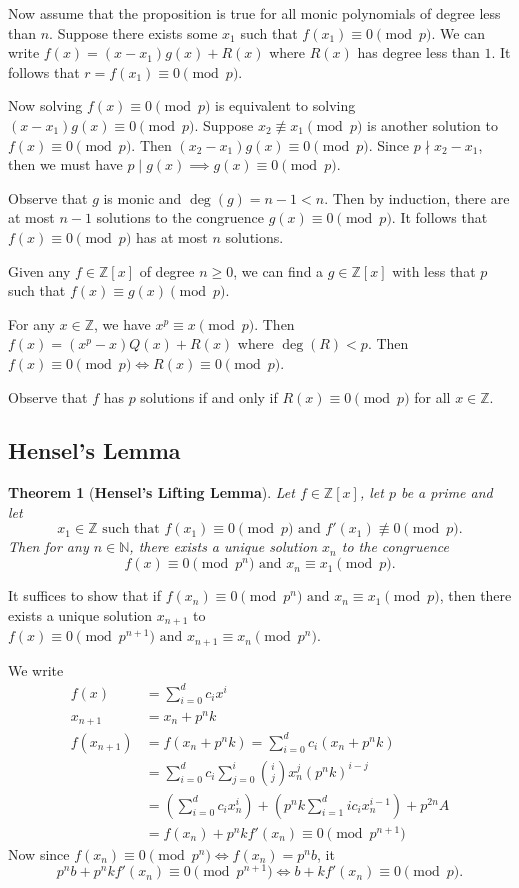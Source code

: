 \documentclass[11pt]{article}
\newtheorem{thm}{Theorem}[section]
\theoremstyle{definition}
\newcommand{\The}[2]{\begin{#1}#2\end{#1}}
\newcommand{\st}[0]{\text{ such that }}
\newcommand{\et}[0]{\text{ and }}
\newcommand{\ZZ}{\mathbb{Z}}
\newcommand{\NN}{\mathbb{N}}
\begin{document}
Now assume that the proposition is true for all monic polynomials of degree less than $n$. Suppose there exists some $x_1$ such that $f(x_1) \equiv 0 \pmod{p}$. 
We can write $f(x) = (x-x_1)g(x) + R(x)$ where $R(x)$ has degree less than $1$. It follows that $r = f(x_1) \equiv 0 \pmod{p}$. 

Now solving $f(x)\equiv 0 \pmod{p}$ is equivalent to solving $(x-x_1)g(x) \equiv 0 \pmod{p}$. Suppose $x_2\not\equiv x_1 \pmod{p}$ is another solution to $f(x)\equiv 0 \pmod{p}$. Then $(x_2-x_1)g(x) \equiv 0 \pmod{p}$. Since $p \nmid x_2-x_1$, then we must have $p \mid g(x) \implies g(x) \equiv 0 \pmod{p}$. 

Observe that $g$ is monic and $\deg(g)=n-1 < n$. Then by induction, there are at most $n-1$ solutions to the congruence $g(x)\equiv0 \pmod{p}$. It follows that $f(x)\equiv 0 \pmod{p}$ has at most $n$ solutions. 
\qedhere

\The{prop} {
	Given any $f\in\ZZ[x]$ of degree $n\ge0$, we can find a $g\in\ZZ[x]$ with less that $p$ such that $f(x) \equiv g(x) \pmod{p}$. 
}
\proof 
For any $x\in\ZZ$, we have $x^p \equiv x \pmod{p}$. Then $f(x) = (x^p-x)Q(x) + R(x)$ where $\deg(R) < p$. 
Then $f(x) \equiv 0 \pmod{p} \iff R(x) \equiv 0 \pmod{p}$. 

Observe that $f$ has $p$ solutions if and only if $R(x) \equiv 0 \pmod{p}$ for all $x\in\ZZ$.
\qedhere


\subsection{Hensel's Lemma}
\begin{thm}[\textbf{Hensel's Lifting Lemma}]
Let $f\in\ZZ[x]$, let $p$ be a prime and let 
$$x_1\in\ZZ \st f(x_1)\equiv0\pmod{p} \et f'(x_1)\not\equiv0\pmod{p}.$$
Then for any $n\in\NN$, there exists a unique solution $x_n$ to the congruence 
$$f(x)\equiv0\pmod{p^n} \et x_n\equiv x_1\pmod{p}.$$
\end{thm}
\proof 
It suffices to show that if $f(x_n)\equiv 0 \pmod{p^n} \et x_n\equiv x_1\pmod{p}$, then there exists a unique solution $x_{n+1}$ to $f(x)\equiv 0\pmod{p^{n+1}} \et x_{n+1} \equiv x_n \pmod{p^n}$. 

We write 
\begin{align*}
	f(x) &= \sum_{i=0}^{d} c_i x^i \\
	x_{n+1} &= x_n + p^n k \\
	f(x_{n+1}) &= f(x_n + p^n k) = \sum_{i=0}^{d} c_i(x_n + p^n k) \\
		&= \sum_{i=0}^{d} c_i \sum_{j=0}^{i} \binom{i}{j} x_n^j (p^nk)^{i-j} \\
		&= \left(\sum_{i=0}^{d} c_i x_n^i\right) + \left(p^nk \sum_{i=1}^{d} ic_i x_n^{i-1} \right) + p^{2n} A \\
		&= f(x_n) + p^n k f'(x_n) \equiv 0 \pmod{p^{n+1}}
\end{align*}
Now since $f(x_n)\equiv 0 \pmod{p^n} \iff f(x_n) = p^n b$, it 
$$ p^n b + p^n k f'(x_n) \equiv 0 \pmod{p^{n+1}} \iff b+kf'(x_n) \equiv 0 \pmod{p}. $$ 
\end{document}
